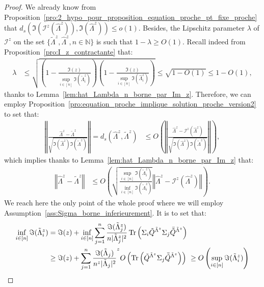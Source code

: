 \documentclass[a4papaer, titlepage]{book}
\begin{document}
  \begin{proof}
    We already know from Proposition~\ref{pro:2_hypo_pour_proposition_equation_proche_pt_fixe_proche} that $d_s \left(\Im(\mathcal I^z(\hat \Lambda^z)), \Im(\hat \Lambda^z)\right)  \leq o(1)$. Besides, the Lipschitz parameter $\lambda$ of $\mathcal I^z$ on the set $\{\tilde \Lambda^z, \hat \Lambda^z, n \in \mathbb N\}$ is such that $1-\lambda \geq O(1)$. Recall indeed from Proposition~\ref{pro:I_z_contractante} that:
    \begin{align*}
       \lambda 
       &\leq \sqrt{\left(1 - \frac{\Im(z)}{\sup_{i\in [n]} \Im(\tilde \Lambda_i^z)}\right) \left(1 - \frac{\Im(z)}{\sup_{i\in [n]} \Im(\hat \Lambda_i^z)}\right)}
        \leq \sqrt{1 - O(1)} \leq 1 - O(1),
     \end{align*} 
     thanks to Lemma~\ref{lem:hat_Lambda_n_borne_par_Im_z}.
     Therefore, we can employ Proposition~\ref{pro:equation_proche_implique_solution_proche_version2} to set that:%
      \begin{align*}
         \left\Vert \frac{\hat \Lambda^z - \tilde \Lambda^z}{\sqrt{\Im(\hat \Lambda^z) \Im(\tilde \Lambda^z)}}\right\Vert =
         d_s(\hat \Lambda^z, \tilde \Lambda^z) 
         & \leq O \left(\left\Vert  \frac{\hat \Lambda^z - \mathcal I^z(\hat \Lambda^z)}{\sqrt{\Im(\hat \Lambda^z) \Im(\tilde \Lambda^z)}}\right\Vert\right),
       \end{align*} 
       which implies thanks to Lemma~\ref{lem:hat_Lambda_n_borne_par_Im_z} that:
       \begin{align*}
         \left\Vert\hat \Lambda^z - \tilde \Lambda^z \right\Vert 
         &\leq  O \left(\sqrt{\frac{\sup_{i\in [n]}\Im(\tilde \Lambda^z_i)}{\inf_{i\in [n]}\Im(\tilde \Lambda^z_i)}}\left\Vert \hat \Lambda^z - \mathcal I^z(\hat \Lambda^z)\right\Vert \right).
       \end{align*}
       We reach here the only point of the whole proof where we will employ Assumption~\ref{ass:Sigma_borne_inferieurement}. It is to set that:
       \begin{align*}
         \inf_{i\in [n]}\Im(\tilde \Lambda^z_i) 
         &= \Im(z) + \inf_{i\in [n]}\sum_{j=1}^n\frac{\Im(\tilde\Lambda_j^z)}{n|\tilde \Lambda_j^z|^2} \operatorname{Tr} \left(\Sigma_i \tilde Q^{\tilde \Lambda^z} \Sigma_j \bar{\tilde Q}^{\tilde \Lambda^z}\right)\\
         &\geq  \Im(z) + \sum_{j=1}^n\frac{\Im(\tilde\Lambda_j)}{n^z|\tilde \Lambda_j|^2}^z O \left(\operatorname{Tr} \left( \tilde Q^{\tilde \Lambda^z} \Sigma_j \bar{\tilde Q}^{\tilde \Lambda^z}\right)\right)
         \ \geq O \left(\sup_{i\in [n]}\Im(\tilde \Lambda^z_i)\right)
       \end{align*}


\end{proof}
\end{document}

